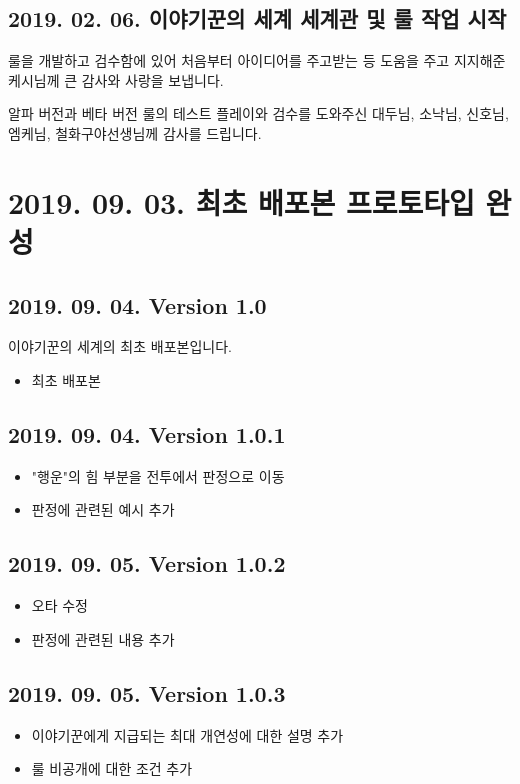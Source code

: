 \documentclass{report}
\begin{document}
	\subsection*{2019. 02. 06. 이야기꾼의 세계 세계관 및 룰 작업 시작}
	룰을 개발하고 검수함에 있어 처음부터 아이디어를 주고받는 등 도움을 주고 지지해준 케시님께 큰 감사와 사랑을 보냅니다.
	
	알파 버전과 베타 버전 룰의 테스트 플레이와 검수를 도와주신 대두님, 소낙님, 신호님, 엠케님, 철화구야선생님께 감사를 드립니다.
\iffullchangelog
	\section*{2019. 09. 03. 최초 배포본 프로토타입 완성}
	\subsection*{2019. 09. 04. Version 1.0}
	이야기꾼의 세계의 최초 배포본입니다.
	\begin{itemize}
		\item 최초 배포본
	\end{itemize}
	
	\subsection*{2019. 09. 04. Version 1.0.1}
	\begin{itemize}
		\item "행운"의 힘 부분을 전투에서 판정으로 이동
		\item 판정에 관련된 예시 추가
	\end{itemize}
	
	\subsection*{2019. 09. 05. Version 1.0.2}
	\begin{itemize}
		\item 오타 수정
		\item 판정에 관련된 내용 추가
	\end{itemize}
	
	\subsection*{2019. 09. 05. Version 1.0.3}
	\begin{itemize}
		\item 이야기꾼에게 지급되는 최대 개연성에 대한 설명 추가
		\item 룰 비공개에 대한 조건 추가
	\end{itemize}
	
\end{document}
